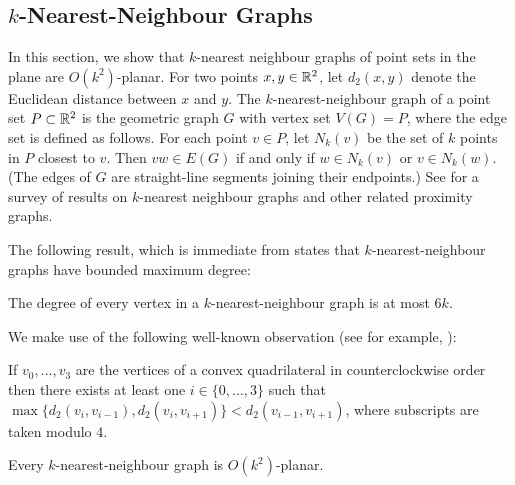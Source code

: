 \documentclass{patmorin}
\renewcommand{\le}{\leqslant}
\begin{document}
\subsection{$k$-Nearest-Neighbour Graphs}

In this section, we show that $k$-nearest neighbour graphs of point sets in the plane are $O(k^2)$-planar.  For two points $x,y\in\mathbb{R}^2$, let $d_2(x,y)$ denote the Euclidean distance between $x$ and $y$. The $k$-nearest-neighbour graph of a point set $P\subset\mathbb{R}^2$ is the geometric graph $G$ with vertex set $V(G)=P$, where the edge set is defined as follows. For each point $v\in P$, let $N_k(v)$ be the set of $k$ points in $P$ closest to $v$. Then $vw\in E(G)$ if and only if $w\in N_k(v)$ or $v\in N_k(w)$. 
(The edges of $G$ are straight-line segments joining their endpoints.) See \citep{ProximityGraphs} for a survey of results on $k$-nearest neighbour graphs and other related proximity graphs. 

The following result, which is immediate from \citet[Corollary~4.2.6]{abrego.munroy.ea:on} states that $k$-nearest-neighbour graphs have bounded maximum degree:
\begin{lem}
\label{k-nn-max-degree}
The degree of every vertex in a $k$-nearest-neighbour graph is at most $6k$.
\end{lem}

We make use of the following well-known observation (see for example, \citet[Lemma~2]{bose.morin.ea:routing}):
\begin{obs}
\label{convex}
If $v_0,\ldots,v_3$ are the vertices of a convex quadrilateral in counterclockwise order then there exists at least one $i\in\{0,\ldots,3\}$ such that $\max\{d_2(v_i,v_{i-1}), d_2(v_i,v_{i+1})\} < d_2(v_{i-1},v_{i+1})$, where subscripts are taken modulo 4.
\end{obs}

\begin{lem}
\label{nearest-neighbour}
  Every $k$-nearest-neighbour graph is $O(k^2)$-planar.
\end{lem}
\end{document}
